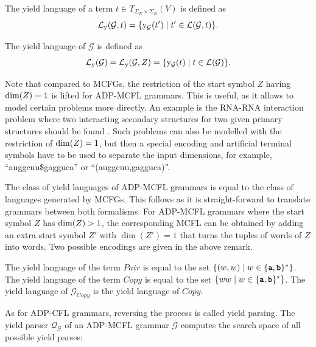 \documentclass[
    a4paper,
    12pt,
    twoside,
    BCOR=12mm,
    parskip=half,
    chapterprefix,
    numbers=noenddot,
    bibliography=totoc
]{scrbook}
\begin{document}
The yield language of a term $t \in T_{\Sigma_E \times \Sigma_R}(V)$ is defined as 
\begin{equation}
	\mathcal{L}_{\mathrm{y}}(\mathcal{G},t) = \{ \mathrm{y}_\mathcal{G}(t') \mid t' \in \mathcal{L}(\mathcal{G},t) \}.
\end{equation}

The yield language of $\mathcal{G}$ is defined as 
\begin{equation}
	\mathcal{L}_{\mathrm{y}}(\mathcal{G}) = \mathcal{L}_{\mathrm{y}}(\mathcal{G},Z) = \{ \mathrm{y}_\mathcal{G}(t) \mid t \in \mathcal{L}(\mathcal{G}) \}.
\end{equation}

\begin{remark}
	Note that compared to \glspl{MCFG}, the restriction of the start symbol $Z$ having $\mathrm{dim}(Z)=1$ is lifted for ADP-MCFL grammars. This is useful, as it allows to model certain problems more directly. An example is the RNA-RNA interaction problem where two interacting secondary structures for two given primary structures should be found \citep{andersen_topology_2012}. Such problems can also be modelled with the restriction of $\mathrm{dim}(Z)=1$, but then a special encoding and artificial terminal symbols have to be used to separate the input dimensions, for example, ``auggcuu\$gagguca'' or ``(auggcuu,gagguca)''.
\end{remark}

The class of yield languages of ADP-MCFL grammars is equal to the class of languages generated by \glspl{MCFG}. This follows as it is straight-forward to translate grammars between both formalisms. For ADP-MCFL grammars where the start symbol $Z$ has $\mathrm{dim}(Z)>1$, the corresponding \gls{MCFL} can be obtained by adding an extra start symbol $Z'$ with $\dim(Z')=1$ that turns the tuples of words of $Z$ into words. Two possible encodings are given in the above remark.

\begin{example}[continues=ex:adp_mcfl_copylang]
	The yield language of the term $Pair$ is equal to the set $\{ (w,w) \mid w \in \{\ts{a},\ts{b}\}^* \}$.
	The yield language of the term $Copy$ is equal to the set $\{ ww \mid w \in \{\ts{a},\ts{b}\}^* \}$. The yield language of $\mathcal{G}_{Copy}$ is the yield language of $Copy$.
\end{example}

As for ADP-CFL grammars, reversing the process is called yield parsing. The yield parser $\mathcal{Q}_\mathcal{G}$ of an ADP-MCFL grammar $\mathcal{G}$ computes the search space of all possible yield parses:
\end{document}
